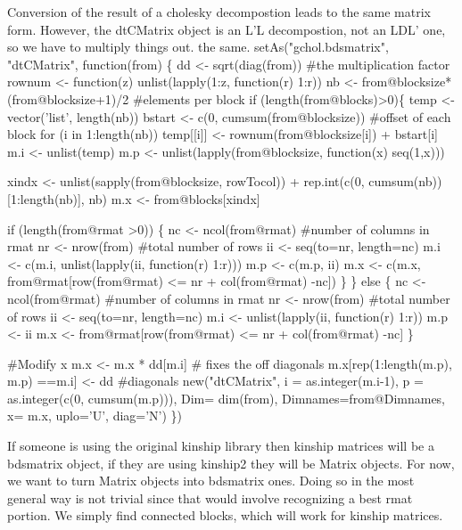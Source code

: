 \documentclass{article}
\begin{document}
Conversion of the result of a cholesky decompostion leads to the
same matrix form.  However, the dtCMatrix object is an L'L
decompostion, not an LDL' one, so we have to multiply things
out.
the same.
\nwenddocs{}\plusendmoddef
setAs("gchol.bdsmatrix", "dtCMatrix", function(from) \{
    dd <- sqrt(diag(from))  #the multiplication factor
    rownum <- function(z) unlist(lapply(1:z, function(r) 1:r))
    nb <- from@blocksize* (from@blocksize+1)/2  #elements per block
    if (length(from@blocks)>0)\{
        temp <- vector('list', length(nb))
        bstart <- c(0, cumsum(from@blocksize)) #offset of each block
        for (i in 1:length(nb)) 
            temp[[i]] <- rownum(from@blocksize[i]) + bstart[i]
        m.i <- unlist(temp)
        m.p <- unlist(lapply(from@blocksize, function(x) seq(1,x)))

        xindx <- unlist(sapply(from@blocksize, rowTocol)) +
                 rep.int(c(0, cumsum(nb))[1:length(nb)], nb)      
        m.x <- from@blocks[xindx]

        if (length(from@rmat >0)) \{
            nc <- ncol(from@rmat)  #number of columns in rmat
            nr <- nrow(from)     #total number of rows
            ii <- seq(to=nr, length=nc)
            m.i <- c(m.i, unlist(lapply(ii, function(r) 1:r)))
            m.p <- c(m.p, ii)
            m.x <- c(m.x, from@rmat[row(from@rmat) <= nr + col(from@rmat) -nc])
        \}
    \}
    else \{
        nc <- ncol(from@rmat)  #number of columns in rmat
        nr <- nrow(from)     #total number of rows
        ii <- seq(to=nr, length=nc)
        m.i <- unlist(lapply(ii, function(r) 1:r))
        m.p <- ii
        m.x <- from@rmat[row(from@rmat) <= nr + col(from@rmat) -nc]
    \} 
        
    #Modify x
    m.x <- m.x * dd[m.i]  # fixes the off diagonals
    m.x[rep(1:length(m.p), m.p) ==m.i] <- dd  #diagonals
    new("dtCMatrix", 
        i = as.integer(m.i-1),
        p = as.integer(c(0, cumsum(m.p))),
        Dim= dim(from),
        Dimnames=from@Dimnames,
        x= m.x,
        uplo='U',
        diag='N')
\})             
\nwendcode{}\nwdocspar

If someone is using the original kinship library then kinship
matrices will be a bdsmatrix object, if they are using
kinship2 they will be Matrix objects.
For now, we want to turn Matrix objects into bdsmatrix ones.
Doing so in the most general way is not trivial since that would
involve recognizing a best rmat portion.  We simply find connected
blocks, which will work for kinship matrices.  
\end{document}
